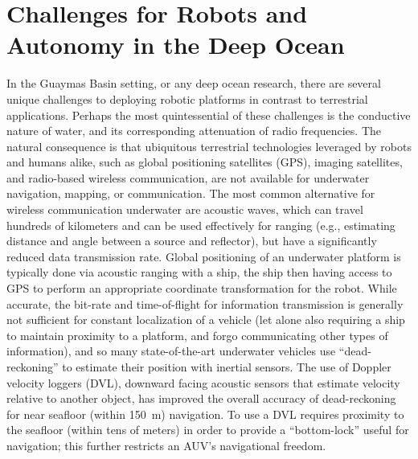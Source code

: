 \section{Challenges for Robots and Autonomy in the Deep Ocean}
\label{sec:ops_challenges}
In the Guaymas Basin setting, or any deep ocean research, there are several unique challenges to deploying robotic platforms in contrast to terrestrial applications. Perhaps the most quintessential of these challenges is the conductive nature of water, and its corresponding attenuation of radio frequencies\autocite{qureshi2016rf}. The natural consequence is that ubiquitous terrestrial technologies leveraged by robots and humans alike, such as global positioning satellites (GPS), imaging satellites, and radio-based wireless communication, are not available for underwater navigation, mapping, or communication. The most common alternative for wireless communication underwater are acoustic waves, which can travel hundreds of kilometers and can be used effectively for ranging (e.g., estimating distance and angle between a source and reflector), but have a significantly reduced data transmission rate\autocite{qureshi2016rf}. Global positioning of an underwater platform is typically done via acoustic ranging with a ship, the ship then having access to GPS to perform an appropriate coordinate transformation for the robot. While accurate, the bit-rate and time-of-flight for information transmission is generally not sufficient for constant localization of a vehicle (let alone also requiring a ship to maintain proximity to a platform, and forgo communicating other types of information), and so many state-of-the-art underwater vehicles use ``dead-reckoning'' to estimate their position with inertial sensors. The use of Doppler velocity loggers (DVL), downward facing acoustic sensors that estimate velocity relative to another object, has improved the overall accuracy of dead-reckoning for near seafloor (within \SI{150}{\meter}) navigation\autocite{stutters2008navigation,liu2022dvl,fong2006evaluation,rigby2006towards}. To use a DVL requires proximity to the seafloor (within tens of meters) in order to provide a ``bottom-lock'' useful for navigation; this further restricts an AUV's navigational freedom.


